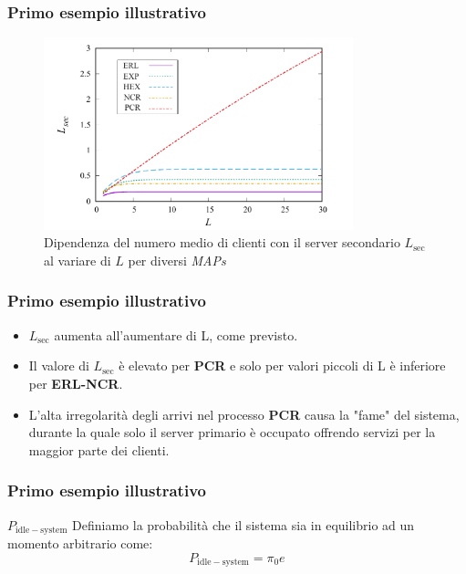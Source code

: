 \documentclass{beamer}
\begin{document}
\begin{frame}
    \frametitle{Primo esempio illustrativo}
    \begin{figure}[h]
        \centering
        \includegraphics[width=0.8\textwidth]{Tcjl81t.png}
        \caption{Dipendenza del numero medio di clienti con il server secondario $L_{\mathrm{sec}}$ al variare di $L$ per diversi \emph{MAPs}}
        \label{fig:2}
    \end{figure}
\end{frame}


\begin{frame}
    \frametitle{Primo esempio illustrativo}
        \begin{itemize}
            \item $L_{\mathrm{sec}}$ aumenta all'aumentare di L, come previsto.
            \item Il valore di $L_{\mathrm{sec}}$ è elevato per \textbf{PCR} e solo per valori piccoli di L è inferiore per \textbf{ERL-NCR}.
            \item L'alta irregolarità degli arrivi nel processo \textbf{PCR} causa la "fame" del sistema, durante la quale solo il server primario è occupato offrendo servizi per la maggior parte dei clienti.
        \end{itemize}
\end{frame}


\begin{frame}
    \frametitle{Primo esempio illustrativo}
    \begin{block}{$P_{\mathrm{idle-system}}$}
        Definiamo la probabilità che il sistema sia in equilibrio ad un momento arbitrario come:
        $$  P_{\mathrm{idle-system}} = \pi_0 e $$
    \end{block}
\end{frame}
\end{document}
